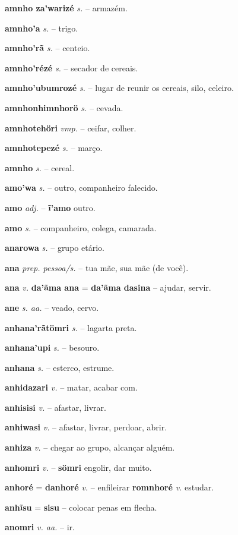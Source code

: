 \textbf{amnho za'warizé} \textit{s.} -- armazém.

\textbf{amnho'a} \textit{s.} -- trigo.

\textbf{amnho'rã} \textit{s.} -- centeio.

\textbf{amnho'rézé} \textit{s.} -- secador de cereais.

\textbf{amnho'ubumrozé} \textit{s.} -- lugar de reunir os cereais, silo, celeiro.

\textbf{amnhonhimnhorö} \textit{s.} -- cevada.

\textbf{amnhotehöri} \textit{vmp.} -- ceifar, colher.

\textbf{amnhotepezé} \textit{s.} -- março.

\textbf{amnho} \textit{s.} -- cereal.

\textbf{amo'wa} \textit{s.} -- outro, companheiro falecido.

\textbf{amo} \textit{adj.} -- \textbf{ĩ'amo} outro.

\textbf{amo} \textit{s.} -- companheiro, colega, camarada.

\textbf{anarowa} \textit{s.} -- grupo etário.

\textbf{ana} \textit{prep. pessoa/s.} -- tua mãe, sua mãe (de você).

\textbf{ana} \textit{v.} \textbf{da'ãma ana} = \textbf{da'ãma dasina} -- ajudar, servir.

\textbf{ane} \textit{s. aa.} -- veado, cervo.

\textbf{anhana'rãtömri} \textit{s.} -- lagarta preta.

\textbf{anhana'upi} \textit{s.} -- besouro.

\textbf{anhana} \textit{s.} -- esterco, estrume.

\textbf{anhidazari} \textit{v.} -- matar, acabar com.

\textbf{anhisisi} \textit{v.} -- afastar, livrar.

\textbf{anhiwasi} \textit{v.} -- afastar, livrar, perdoar, abrir.

\textbf{anhiza} \textit{v.} -- chegar ao grupo, alcançar alguém.

\textbf{anhomri} \textit{v.} -- \textbf{sömri} engolir, dar muito.

\textbf{anhoré} = \textbf{danhoré} \textit{v.} -- enfileirar  \textbf{romnhoré} \textit{v.} estudar.

\textbf{anhĩsu} = \textbf{sisu} -- colocar penas em flecha.

\textbf{anomri} \textit{v. aa.} -- ir.


